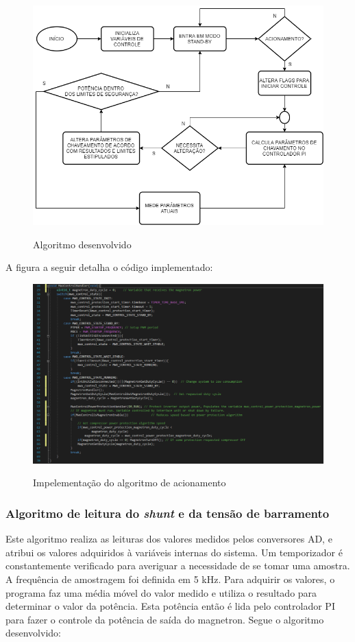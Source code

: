 \begin{figure}[H]
    \centering
    \caption{Algoritmo desenvolvido}
    \includegraphics[width=1\textwidth]{./dados/figuras/mwo_flow}
    \label{fig:figura-mwo_flow}
\end{figure}

A figura a seguir detalha o código implementado:

\begin{figure}[H]
    \centering
    \caption{Impelementação do algoritmo de acionamento}
    \includegraphics[width=1\textwidth]{./dados/figuras/func_mwo}
    \label{fig:figura-func_mwo}
\end{figure}

\subsubsection{Algoritmo de leitura do \textit{shunt} e da tensão de barramento}
Este algoritmo realiza as leituras dos valores medidos pelos conversores AD, e atribui os valores adquiridos à variáveis internas do sistema. Um temporizador é constantemente verificado para averiguar a necessidade de se tomar uma amostra. A frequência de amostragem foi definida em  5 kHz. Para adquirir os valores, o programa faz uma média móvel do valor medido e utiliza o resultado para determinar o valor da potência. Esta potência então é lida pelo controlador PI para fazer o controle da potência de saída do magnetron. Segue o algoritmo desenvolvido:

